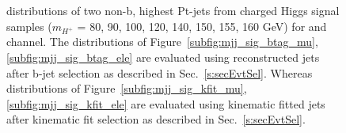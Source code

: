 \begin{figure}
    \centering  
    \vfil
    \caption{\mjj distributions of two non-b, highest Pt-jets from charged
        Higgs signal samples ($m_{H^+}$ = 80, 90, 100, 120, 140, 150, 155, 
        160 GeV) for \mujets and \ejets channel. The \mjj
        distributions of Figure~\ref{subfig:mjj_sig_btag_mu}, 
        \ref{subfig:mjj_sig_btag_ele} are evaluated using reconstructed jets 
        after b-jet selection as described in Sec.~\ref{s:secEvtSel}. Whereas
        \mjj distributions of Figure~\ref{subfig:mjj_sig_kfit_mu}, 
        \ref{subfig:mjj_sig_kfit_ele} are evaluated using kinematic fitted 
        jets after kinematic fit selection as described in Sec.~\ref{s:secEvtSel}. 
    }
    \label{fig:mjjBTagKinFit_Sig}
\end{figure}

